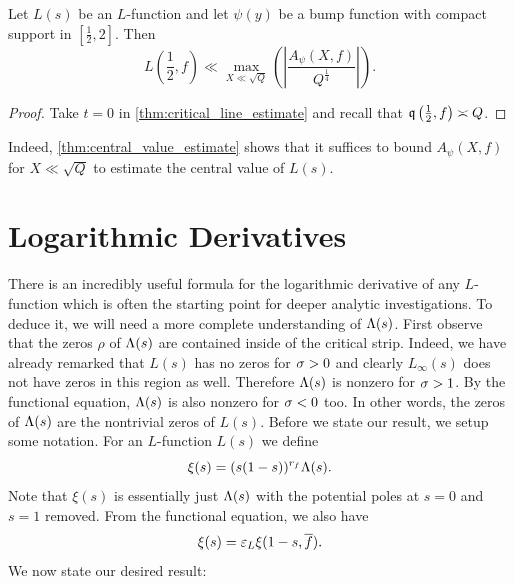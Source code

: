 \documentclass[12pt]{article}
\begin{document}
    \begin{theorem}\label{thm:central_value_estimate}
      Let \(L(s)\) be an \(L\)-function and let \(\psi(y)\) be a bump function with compact support in \(\left[\frac{1}{2},2\right]\). Then
      \[
        L\left(\frac{1}{2},f\right) \ll \max_{X \ll \sqrt{Q}}\left(\left|\frac{A_{\psi}(X,f)}{Q^{\frac{1}{4}}}\right|\right).
      \]
    \end{theorem}
    \begin{proof}
      Take \(t = 0\) in \cref{thm:critical_line_estimate} and recall that \(\mathfrak{q}\left(\frac{1}{2},f\right) \asymp Q\).
    \end{proof}

    Indeed, \cref{thm:central_value_estimate} shows that it suffices to bound \(A_{\psi}(X,f)\) for \(X \ll \sqrt{Q}\) to estimate the central value of \(L(s)\).
  \section{Logarithmic Derivatives}
    There is an incredibly useful formula for the logarithmic derivative of any \(L\)-function which is often the starting point for deeper analytic investigations. To deduce it, we will need a more complete understanding of \(\Lambda(s)\). First observe that the zeros \(\rho\) of \(\Lambda(s)\) are contained inside of the critical strip. Indeed, we have already remarked that \(L(s)\) has no zeros for \(\sigma > 0\) and clearly \(L_{\infty}(s)\) does not have zeros in this region as well. Therefore \(\Lambda(s)\) is nonzero for \(\sigma > 1\). By the functional equation, \(\Lambda(s)\) is also nonzero for \(\sigma < 0\) too. In other words, the zeros of \(\Lambda(s)\) are the nontrivial zeros of \(L(s)\). Before we state our result, we setup some notation. For an \(L\)-function \(L(s)\) we define
    \[
      \xi(s) = (s(1-s))^{r_{f}}\Lambda(s).
    \]
    Note that \(\xi(s)\) is essentially just \(\Lambda(s)\) with the potential poles at \(s = 0\) and \(s = 1\) removed. From the functional equation, we also have
    \[
      \xi(s) = \varepsilon_{L}\xi(1-s,\overline{f}).
    \]
    We now state our desired result:
\end{document}
